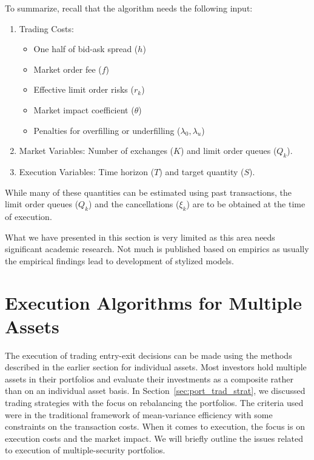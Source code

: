 To summarize, recall that the algorithm needs the following input:
	\begin{enumerate}[--]
	\item Trading Costs: 
		\begin{itemize}
		\item One half of bid-ask spread ($h$)
		\item Market order fee ($f$)
		\item Effective limit order risks ($r_k$)
		\item Market impact coefficient ($\theta$)
		\item Penalties for overfilling or underfilling ($\lambda_0,\lambda_u$)
		\end{itemize}
	\item Market Variables: Number of exchanges ($K$) and limit order queues ($Q_k$).
	\item Execution Variables: Time horizon ($T$) and target quantity ($S$).
	\end{enumerate}
While many of these quantities can be estimated using past transactions, the limit order queues ($Q_k$) and the cancellations ($\xi_k$) are to be obtained at the time of execution.


What we have presented in this section is very limited as this area needs significant academic research. Not much is published based on empirics as usually the empirical findings lead to development of stylized models. 


\section{Execution Algorithms for Multiple Assets}

The execution of trading entry-exit decisions can be made using the methods described in the earlier section for individual assets. Most investors hold multiple assets in their portfolios and evaluate their investments as a composite rather than on an individual asset basis. In Section~\ref{sec:port_trad_strat}, we discussed trading strategies with the focus on rebalancing the portfolios. The criteria used were in the traditional framework of mean-variance efficiency with some constraints on the transaction costs. When it comes to execution, the focus is on execution costs and the market impact. We will briefly outline the issues related to execution of multiple-security portfolios.




